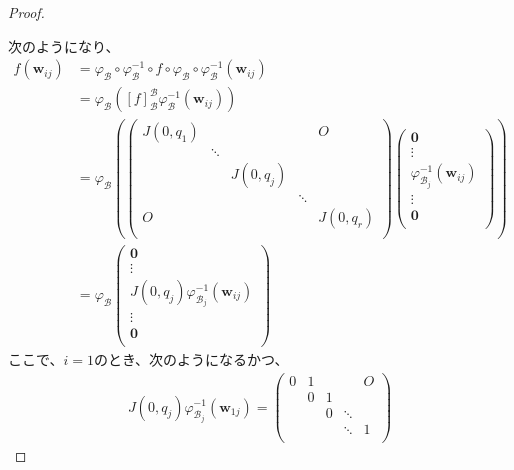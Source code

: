 \documentclass[dvipdfmx]{jsarticle}
\begin{document}
\begin{proof}
\begin{center}
\begin{tikzpicture}[auto]
  \end{tikzpicture} 
\end{center}
次のようになり、
\begin{align*}
f\left( \mathbf{w}_{ij} \right) &= \varphi_{\mathcal{B}} \circ \varphi_{\mathcal{B}}^{- 1} \circ f \circ \varphi_{\mathcal{B}} \circ \varphi_{\mathcal{B}}^{- 1}\left( \mathbf{w}_{ij} \right)\\
&= \varphi_{\mathcal{B}}\left( [ f]_{\mathcal{B}}^{\mathcal{B}}\varphi_{\mathcal{B}}^{- 1}\left( \mathbf{w}_{ij} \right) \right)\\
&= \varphi_{\mathcal{B}}\left( \begin{pmatrix}
J\left( 0,q_{1} \right) & \  & \  & \  & O \\
\  & \ddots & \  & \  & \  \\
\  & \  & J\left( 0,q_{j} \right) & \  & \  \\
\  & \  & \  & \ddots & \  \\
O & \  & \  & \  & J\left( 0,q_{r} \right) \\
\end{pmatrix}\begin{pmatrix}
\mathbf{0} \\
 \vdots \\
\varphi_{\mathcal{B}_{j}}^{- 1}\left( \mathbf{w}_{ij} \right) \\
 \vdots \\
\mathbf{0} \\
\end{pmatrix} \right)\\
&= \varphi_{\mathcal{B}}\begin{pmatrix}
\mathbf{0} \\
 \vdots \\
J\left( 0,q_{j} \right)\varphi_{\mathcal{B}_{j}}^{- 1}\left( \mathbf{w}_{ij} \right) \\
 \vdots \\
\mathbf{0} \\
\end{pmatrix}
\end{align*}
ここで、$i = 1$のとき、次のようになるかつ、
\begin{align*}
J\left( 0,q_{j} \right)\varphi_{\mathcal{B}_{j}}^{- 1}\left( \mathbf{w}_{1j} \right) = \begin{pmatrix}
0 & 1 & \  & \  & O \\
\  & 0 & 1 & \  & \  \\
\  & \  & 0 & \ddots & \  \\
\  & \  & \  & \ddots & 1 \\

\end{pmatrix}
\end{align*}
\end{proof}
\end{document}
